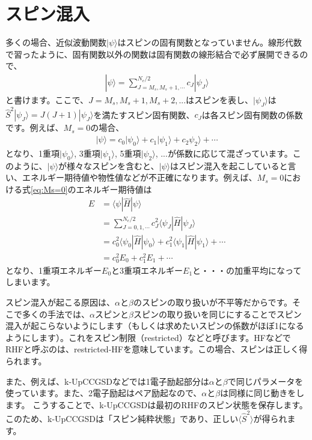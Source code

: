 \documentclass[prb,amsmath,amsfonts,amssymb]{revtex4}
\begin{document}
\section{スピン混入}
多くの場合、近似波動関数$|\psi\rangle$はスピンの固有関数となっていません。線形代数で習ったように、固有関数以外の関数は固有関数の線形結合で必ず展開できるので、
\begin{align}
|\psi\rangle = \sum_{J = M_s, M_s+1,\cdots}^{N_e/2} c_J |\psi_J\rangle	\label{eq:psi}
\end{align}
と書けます。ここで、$J=M_s, M_s+1, M_s + 2, ...$はスピンを表し、$|\psi_J\rangle$は$\hat S^2|\psi_J\rangle = J(J+1)|\psi_J\rangle$を満たすスピン固有関数、$c_J$は各スピン固有関数の係数です。例えば、$M_s=0$の場合、
\begin{align}
|\psi\rangle =  c_0 |\psi_0 \rangle + c_1 |\psi_1 \rangle + c_2 \psi_2\rangle + \cdots \label{eq:Ms=0}	
\end{align}
となり、1重項$|\psi_0\rangle$, 3重項$|\psi_1\rangle$, 5重項$|\psi_2\rangle$, ...が係数に応じて混ざっています。このように、$|\psi\rangle$が様々なスピンを含むと、$|\psi\rangle$はスピン混入を起こしていると言い、エネルギー期待値や物性値などが不正確になります。例えば、$M_s=0$における式\ref{eq:Ms=0}のエネルギー期待値は
\begin{align}
	E &= \langle \psi |\hat H |\psi\rangle \nonumber\\
	&= \sum_{J=0, 1,\cdots}^{N_e/2} c_J^2\langle \psi_J|\hat H |\psi_J\rangle \nonumber\\
	&=c_{0}^2\langle \psi_{0}|\hat H |\psi_{0}\rangle + c_{1}^2\langle \psi_{1}|\hat H |\psi_{1}\rangle +\cdots\nonumber\\
	&= c_{0}^2 E_{0} + c_1^2 E_{1} + \cdots
\end{align}
となり、1重項エネルギー$E_0$と3重項エネルギー$E_1$と・・・の加重平均になってしまいます。

スピン混入が起こる原因は、$\alpha$と$\beta$のスピンの取り扱いが不平等だからです。そこで多くの手法では、$\alpha$スピンと$\beta$スピンの取り扱いを同じにすることでスピン混入が起こらないようにします（もしくは求めたいスピンの係数がほぼ1になるようにします）。これをスピン制限（restricted）などと呼びます。HFなどでRHFと呼ぶのは、restricted-HFを意味しています。この場合、スピンは正しく得られます。

また、例えば、k-UpCCGSDなどでは1電子励起部分は$\alpha$と$\beta$で同じパラメータを使っています。また、2電子励起はペア励起なので、$\alpha$と$\beta$は同様に同じ動きをします。
こうすることで、k-UpCCGSDは最初のRHFのスピン状態を保存します。このため、k-UpCCGSDは「スピン純粋状態」であり、正しい$\langle \hat S^2\rangle$が得られます。
\end{document}

